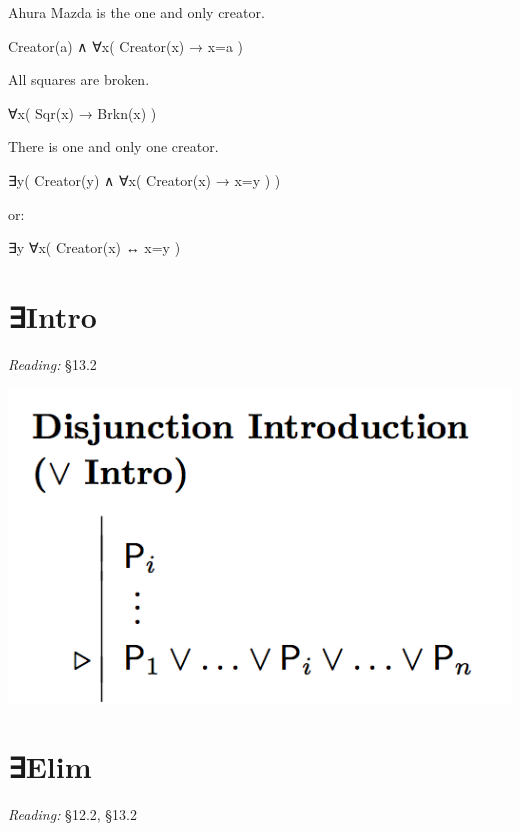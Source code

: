\documentclass[12pt]{extarticle}
\begin{document}
\begin{multicols*}{3}
Ahura Mazda is the one and only creator.
 
\hspace{3mm} Creator(a) ∧ ∀x( Creator(x) → x=a )
 
All squares are broken.
 
\hspace{3mm} ∀x( Sqr(x) → Brkn(x) )
 
There is one and only one creator.
 
\hspace{3mm} ∃y( Creator(y) ∧ ∀x( Creator(x) → x=y ) )
 
\hspace{3mm} or:
 
\hspace{3mm} ∃y ∀x( Creator(x) ↔ x=y )
 
 \columnbreak
 
 
\section{∃Intro}
 
\emph{Reading:} §13.2
 
\begin{center}
\includegraphics[scale=0.3]{img/rule_disjunction_intro.png}
\end{center}
 
 
\section{∃Elim}
 
\emph{Reading:} §12.2, §13.2
 

\end{multicols*}
\end{document}
